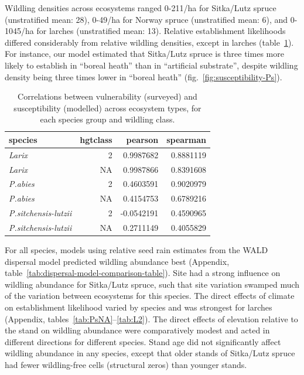 \documentclass[
]{article}
\begin{document}
Wildling densities across ecosystems ranged 0-211/ha for Sitka/Lutz spruce
(unstratified mean: 28), 0-49/ha for Norway spruce (unstratified mean: 6), and
0-1045/ha for larches (unstratified mean: 13). Relative establishment
likelihoods differed considerably from relative wildling densities, except in
larches (table~\ref{tab:vul-sus-cor-table}). For instance, our model estimated
that Sitka/Lutz spruce is three times more likely to establish in ``boreal heath''
than in ``artificial substrate'', despite wildling density being three times lower
in ``boreal heath'' (fig.~\ref{fig:susceptibility-Ps}).

\begin{table}

\caption{\label{tab:vul-sus-cor-table}Correlations between vulnerability (surveyed) and susceptibility (modelled) across ecosystem types, for each species group and wildling class.}
\centering
\begin{tabular}[t]{>{}lrrr}
\toprule
species & hgtclass & pearson & spearman\\
\midrule
\em{Larix} & 2 & 0.9987682 & 0.8881119\\
\em{Larix} & NA & 0.9987866 & 0.8391608\\
\em{P.abies} & 2 & 0.4603591 & 0.9020979\\
\em{P.abies} & NA & 0.4154753 & 0.6789216\\
\em{P.sitchensis-lutzii} & 2 & -0.0542191 & 0.4590965\\
\addlinespace
\em{P.sitchensis-lutzii} & NA & 0.2711149 & 0.4055829\\
\bottomrule
\end{tabular}
\end{table}

For all species, models using relative seed rain estimates from the WALD
dispersal model predicted wildling abundance best (Appendix,
table~\ref{tab:dispersal-model-comparison-table}). Site had a strong influence
on wildling abundance for Sitka/Lutz spruce, such that site variation swamped
much of the variation between ecosystems for this species. The direct effects of
climate on establishment likelihood varied by species and was strongest for
larches (Appendix, tables~\ref{tab:PsNA}--\ref{tab:L2}). The direct effects of
elevation relative to the stand on wildling abundance were comparatively modest
and acted in different directions for different species. Stand age did not
significantly affect wildling abundance in any species, except that older stands
of Sitka/Lutz spruce had fewer wildling-free cells (structural zeros) than
younger stands.
\end{document}
